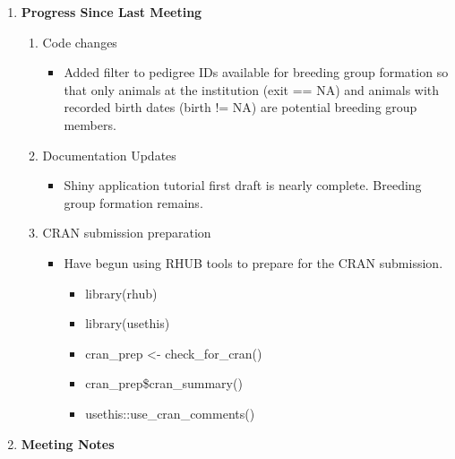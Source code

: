 \documentclass[
]{article}
\providecommand{\tightlist}{%
  \setlength{\itemsep}{0pt}\setlength{\parskip}{0pt}}
\begin{document}
\begin{enumerate}
\def\labelenumi{\arabic{enumi}.}
\item
  \textbf{Progress Since Last Meeting}

  \begin{enumerate}
  \def\labelenumii{\alph{enumii}.}
  \tightlist
  \item
    Code changes

    \begin{itemize}
    \tightlist
    \item
      Added filter to pedigree IDs available for breeding group
      formation so that only animals at the institution (exit == NA) and
      animals with recorded birth dates (birth != NA) are potential
      breeding group members.
    \end{itemize}
  \item
    Documentation Updates

    \begin{itemize}
    \tightlist
    \item
      Shiny application tutorial first draft is nearly complete.
      Breeding group formation remains.
    \end{itemize}
  \item
    CRAN submission preparation

    \begin{itemize}
    \tightlist
    \item
      Have begun using RHUB tools to prepare for the CRAN submission.

      \begin{itemize}
      \tightlist
      \item
        library(rhub)
      \item
        library(usethis)
      \item
        cran\_prep \textless- check\_for\_cran()
      \item
        cran\_prep\$cran\_summary()
      \item
        usethis::use\_cran\_comments()
      \end{itemize}
    \end{itemize}
  \end{enumerate}
\item
  \textbf{Meeting Notes}


\end{enumerate}
\end{document}
